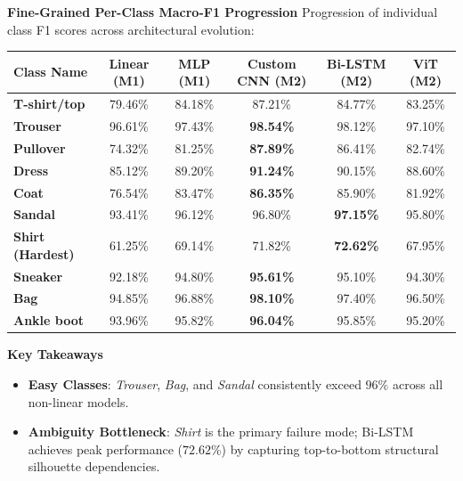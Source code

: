 \documentclass[aspectratio=169, 10pt]{beamer}
\begin{document}
\begin{frame}{\textbf{Fine-Grained Per-Class Macro-F1 Progression}}
  \small
  Progression of individual class F1 scores across architectural evolution:
  \vspace{0.3em}
  \centering
  \scriptsize
  \renewcommand{\arraystretch}{1.1}
  \begin{tabular}{lccccc}
    \toprule
    \textbf{Class Name} & \textbf{Linear (M1)} & \textbf{MLP (M1)} & \textbf{Custom CNN (M2)} & \textbf{Bi-LSTM (M2)} & \textbf{ViT (M2)} \\
    \midrule
    \textbf{T-shirt/top} & 79.46\% & 84.18\% & 87.21\% & 84.77\% & 83.25\% \\
    \textbf{Trouser}     & 96.61\% & 97.43\% & \textbf{98.54\%} & 98.12\% & 97.10\% \\
    \textbf{Pullover}    & 74.32\% & 81.25\% & \textbf{87.89\%} & 86.41\% & 82.74\% \\
    \textbf{Dress}       & 85.12\% & 89.20\% & \textbf{91.24\%} & 90.15\% & 88.60\% \\
    \textbf{Coat}        & 76.54\% & 83.47\% & \textbf{86.35\%} & 85.90\% & 81.92\% \\
    \textbf{Sandal}      & 93.41\% & 96.12\% & 96.80\% & \textbf{97.15\%} & 95.80\% \\
    \rowcolor{hcmutlight}
    \textbf{Shirt (Hardest)} & 61.25\% & 69.14\% & 71.82\% & \textbf{72.62\%} & 67.95\% \\
    \textbf{Sneaker}     & 92.18\% & 94.80\% & \textbf{95.61\%} & 95.10\% & 94.30\% \\
    \textbf{Bag}         & 94.85\% & 96.88\% & \textbf{98.10\%} & 97.40\% & 96.50\% \\
    \textbf{Ankle boot}  & 93.96\% & 95.82\% & \textbf{96.04\%} & 95.85\% & 95.20\% \\
    \bottomrule
  \end{tabular}
  \vspace{0.3em}
  \begin{block}{\scriptsize \textbf{Key Takeaways}}
    \tiny
    \begin{itemize}
      \item \textbf{Easy Classes}: \textit{Trouser}, \textit{Bag}, and \textit{Sandal} consistently exceed $96\%$ across all non-linear models.
      \item \textbf{Ambiguity Bottleneck}: \textit{Shirt} is the primary failure mode; Bi-LSTM achieves peak performance ($72.62\%$) by capturing top-to-bottom structural silhouette dependencies.
    \end{itemize}
  \end{block}
\end{frame}
\end{document}
